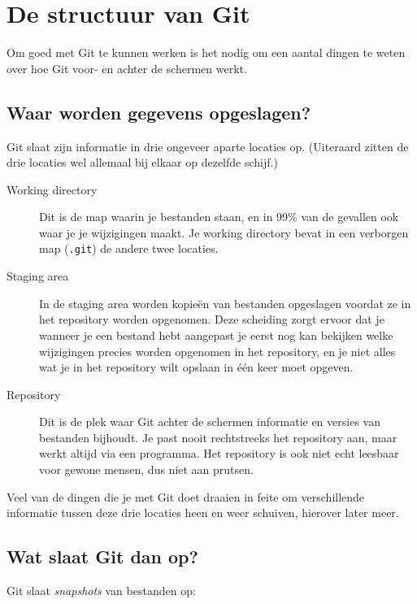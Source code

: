 \section{De structuur van Git}

Om goed met Git te kunnen werken is het nodig om een aantal dingen te weten over hoe Git voor- en achter de schermen werkt.

\subsection{Waar worden gegevens opgeslagen?}
Git slaat zijn informatie in drie ongeveer aparte locaties op. (Uiteraard zitten de drie locaties wel allemaal bij elkaar op dezelfde schijf.)
\begin{description}
	\item[Working directory] Dit is de map waarin je bestanden staan, en in 99\% van de gevallen ook waar je je wijzigingen maakt. Je working directory bevat in een verborgen map (\texttt{.git}) de andere twee locaties.
	\item[Staging area] In de staging area worden kopie\"en van bestanden opgeslagen voordat ze in het repository worden opgenomen. Deze scheiding zorgt ervoor dat je wanneer je een bestand hebt aangepast je eerst nog kan bekijken welke wijzigingen precies worden opgenomen in het repository, en je niet alles wat je in het repository wilt opslaan in \'e\'en keer moet opgeven.
	\item[Repository] Dit is de plek waar Git achter de schermen informatie en versies van bestanden bijhoudt. Je past nooit rechtstreeks het repository aan, maar werkt altijd via een programma. Het repository is ook niet echt leesbaar voor gewone mensen, dus niet aan prutsen.
\end{description}

Veel van de dingen die je met Git doet draaien in feite om verschillende informatie tussen deze drie locaties heen en weer schuiven, hierover later meer.


\subsection{Wat slaat Git dan op?}
Git slaat \emph{snapshots} van bestanden op: 
